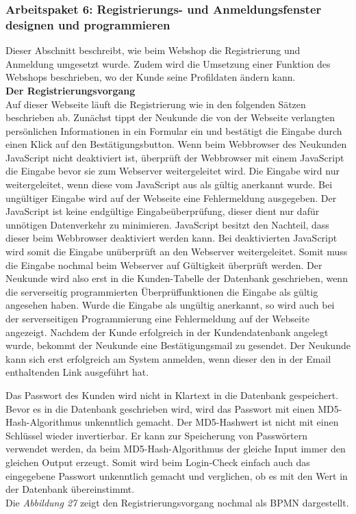 \newpage
\subsubsection{Arbeitspaket 6: Registrierungs- und Anmeldungsfenster designen und programmieren}
Dieser Abschnitt beschreibt, wie beim Webshop die Registrierung und Anmeldung umgesetzt wurde. Zudem wird die Umsetzung einer Funktion des Webshops beschrieben, wo der Kunde seine Profildaten ändern kann.\\

\textbf{Der Registrierungsvorgang}\\
Auf dieser Webseite läuft die Registrierung wie in den folgenden Sätzen beschrieben ab. Zunächst tippt der Neukunde die von der Webseite verlangten persönlichen Informationen in ein Formular ein und bestätigt die Eingabe durch einen Klick auf den Bestätigungsbutton. Wenn beim Webbrowser des Neukunden JavaScript nicht deaktiviert ist, überprüft der Webbrowser mit einem JavaScript die Eingabe bevor sie zum Webserver weitergeleitet wird. Die Eingabe wird nur weitergeleitet, wenn diese vom JavaScript aus als gültig anerkannt wurde. Bei ungültiger Eingabe wird auf der Webseite eine Fehlermeldung ausgegeben. Der JavaScript ist keine endgültige Eingabeüberprüfung, dieser dient nur dafür unnötigen Datenverkehr zu minimieren. JavaScript besitzt den Nachteil, dass dieser beim Webbrowser deaktiviert werden kann. Bei deaktivierten JavaScript wird somit die Eingabe unüberprüft an den Webserver weitergeleitet. Somit muss die Eingabe nochmal beim Webserver auf Gültigkeit überprüft werden.  Der Neukunde wird also erst in die Kunden-Tabelle der Datenbank geschrieben, wenn die serverseitig programmierten Überprüffunktionen die Eingabe als gültig angesehen haben. Wurde die Eingabe als ungültig anerkannt, so wird auch bei der serverseitigen Programmierung eine Fehlermeldung auf der Webseite angezeigt. Nachdem der Kunde erfolgreich in der Kundendatenbank angelegt wurde, bekommt der Neukunde eine Bestätigungsmail zu gesendet. Der Neukunde kann sich erst erfolgreich am System anmelden, wenn dieser den in der Email enthaltenden Link ausgeführt hat. 

Das Passwort des Kunden wird nicht in Klartext in die Datenbank gespeichert. Bevor es in die Datenbank geschrieben wird, wird das Passwort mit einen \glqq MD5-Hash-Algorithmus\grqq{} unkenntlich gemacht. Der MD5-Hashwert ist nicht mit einen Schlüssel wieder invertierbar. Er kann zur Speicherung von Passwörtern verwendet werden, da beim \glqq MD5-Hash-Algorithmus\grqq{} der gleiche Input immer den gleichen Output erzeugt. Somit wird beim Login-Check einfach auch das eingegebene Passwort unkenntlich gemacht und verglichen, ob es mit den Wert in der Datenbank übereinstimmt.\\ Die \textit{Abbildung 27} zeigt den Registrierungsvorgang nochmal als BPMN dargestellt.\\

